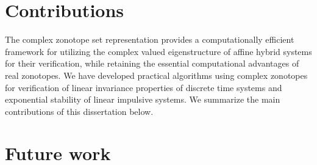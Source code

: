 \section{Contributions}
The complex zonotope set representation provides a computationally
efficient framework for utilizing the complex valued eigenstructure of
affine hybrid systems for their verification, while retaining the
essential computational advantages of real zonotopes.  We have
developed practical algorithms using complex zonotopes for
verification of linear invariance properties of discrete time systems
and exponential stability of linear impulsive systems.  We summarize
the main contributions of this dissertation below.
%


\section{Future work}



